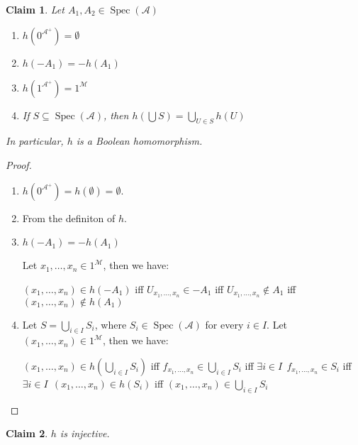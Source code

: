 \documentclass[a4paper]{article}
\theoremstyle{defin}
\theoremstyle{theorem}
\theoremstyle{claim}
\newtheorem{claim}{Claim}
\theoremstyle{prop}
\theoremstyle{lemma}
\theoremstyle{fact}
\theoremstyle{ex}
\theoremstyle{col}
\begin{document}
\begin{claim} Let $A_1, A_2 \in \operatorname{Spec}(\mathcal{A})$
\begin{enumerate}
\item $h(0^{\mathcal{A}^{+}}) = \emptyset$
\item $h(- A_1) = - h(A_1)$
\item $h(1^{\mathcal{A}^{+}}) = 1^{\mathcal{M}}$
\item If $S \subseteq \operatorname{Spec}(\mathcal{A})$, then $h(\bigcup S) = \bigcup \limits_{U \in S} h(U)$
\end{enumerate}
In particular, $h$ is a Boolean homomorphism.
\end{claim}

\begin{proof}
$ $

\begin{enumerate}
\item $h(0^{\mathcal{A}^{+}}) = h(\emptyset) = \emptyset$.
\item From the definiton of $h$.
\item $h(- A_1) = - h(A_1)$

Let $x_1, \dots, x_n \in 1^{\mathcal{M}}$, then we have:

\begin{center}
$(x_1, \dots, x_n) \in h(- A_1)$ iff $U_{x_1, \dots, x_n} \in - A_1$ iff $U_{x_1, \dots, x_n} \notin A_1$ iff $(x_1, \dots, x_n) \notin h(A_1)$
\end{center}
\item Let $S = \bigcup \limits_{i \in I} S_i$, where $S_i \in \operatorname{Spec}(\mathcal{A})$ for every $i \in I$.
Let $(x_1, \dots, x_n) \in 1^{\mathcal{M}}$, then we have:
\begin{center}
$(x_1, \dots, x_n) \in h(\bigcup \limits_{i \in I} S_i)$ iff $f_{x_1, \dots, x_n} \in \bigcup \limits_{i \in I} S_i$ iff $\exists i \in I \:\: f_{x_1, \dots, x_n} \in S_i$ iff $\exists i \in I \:\: (x_1, \dots, x_n) \in h(S_i)$ iff $(x_1, \dots, x_n) \in \bigcup \limits_{i \in I} S_i$
\end{center}
\end{enumerate}
\end{proof}

\begin{claim}
$h$ is injective.
\end{claim}
\end{document}
